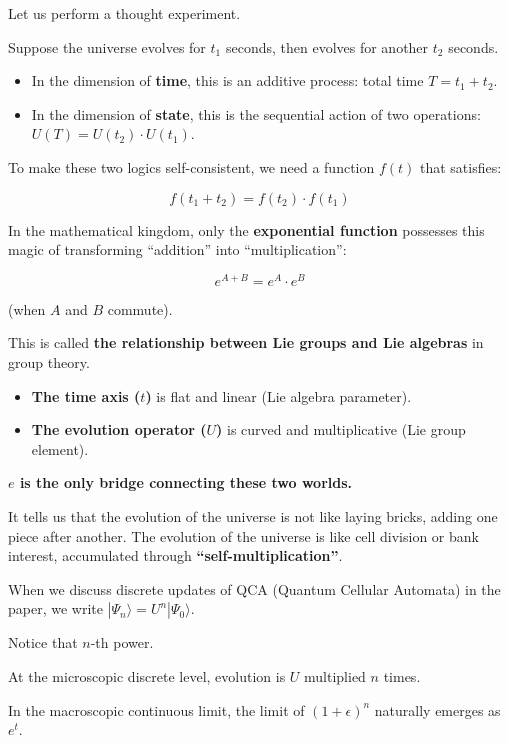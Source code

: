 Let us perform a thought experiment.

Suppose the universe evolves for $t_1$ seconds, then evolves for another $t_2$ seconds.

\begin{itemize}
\item In the dimension of \textbf{time}, this is an additive process: total time $T = t_1 + t_2$.

\item In the dimension of \textbf{state}, this is the sequential action of two operations: $U(T) = U(t_2) \cdot U(t_1)$.
\end{itemize}

To make these two logics self-consistent, we need a function $f(t)$ that satisfies:

$$f(t_1 + t_2) = f(t_2) \cdot f(t_1)$$

In the mathematical kingdom, only the \textbf{exponential function} possesses this magic of transforming ``addition'' into ``multiplication'':

$$e^{A+B} = e^A \cdot e^B$$

(when $A$ and $B$ commute).

This is called \textbf{the relationship between Lie groups and Lie algebras} in group theory.

\begin{itemize}
\item \textbf{The time axis ($t$)} is flat and linear (Lie algebra parameter).

\item \textbf{The evolution operator ($U$)} is curved and multiplicative (Lie group element).
\end{itemize}

\textbf{$e$ is the only bridge connecting these two worlds.}

It tells us that the evolution of the universe is not like laying bricks, adding one piece after another. The evolution of the universe is like cell division or bank interest, accumulated through \textbf{``self-multiplication''}.

When we discuss discrete updates of QCA (Quantum Cellular Automata) in the paper, we write $|\Psi_n\rangle = U^n |\Psi_0\rangle$.

Notice that $n$-th power.

At the microscopic discrete level, evolution is $U$ multiplied $n$ times.

In the macroscopic continuous limit, the limit of $(1 + \epsilon)^n$ naturally emerges as $e^{t}$.

